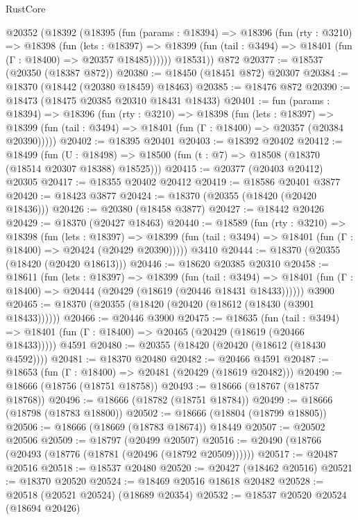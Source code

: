 \begin{lexlean}{RustCore}
\begin{coremodule}
    @20352
      (@18392
        (@18395
          (fun (params : @18394) =>
          @18396
            (fun (rty : @3210) =>
            @18398
              (fun (lets : @18397) =>
              @18399 (fun (tail : @3494) => @18401 (fun (Γ : @18400) => @20357 @18485))))))
        @18531))
    @872
@20377 := @18537 (@20350 (@18387 @872))
@20380 := @18450 (@18451 @872) @20307
@20384 := @18370 (@18442 (@20380 @18459) @18463)
@20385 := @18476 @872
@20390 := @18473 (@18475 @20385 @20310 @18431 @18433)
@20401 := fun (params : @18394) =>
  @18396
    (fun (rty : @3210) =>
    @18398
      (fun (lets : @18397) =>
      @18399 (fun (tail : @3494) => @18401 (fun (Γ : @18400) => @20357 (@20384 @20390)))))
@20402 := @18395 @20401
@20403 := @18392 @20402
@20412 := @18499
    (fun (U : @18498) => @18500 (fun (t : @7) => @18508 (@18370 (@18514 @20307 @18388) @18525)))
@20415 := @20377 (@20403 @20412) @20305
@20417 := @18355 @20402 @20412
@20419 := @18586 @20401 @3877
@20420 := @18423 @3877
@20424 := @18370 (@20355 (@18420 (@20420 @18436)))
@20426 := @20380 (@18458 @3877)
@20427 := @18442 @20426
@20429 := @18370 (@20427 @18463)
@20440 := @18589
    (fun (rty : @3210) =>
    @18398
      (fun (lets : @18397) =>
      @18399 (fun (tail : @3494) => @18401 (fun (Γ : @18400) => @20424 (@20429 @20390)))))
    @3410
@20444 := @18370 (@20355 (@18420 (@20420 @18613)))
@20446 := @18620 @20385 @20310
@20458 := @18611
    (fun (lets : @18397) =>
    @18399
      (fun (tail : @3494) =>
      @18401 (fun (Γ : @18400) => @20444 (@20429 (@18619 (@20446 @18431 @18433))))))
    @3900
@20465 := @18370 (@20355 (@18420 (@20420 (@18612 (@18430 (@3901 @18433))))))
@20466 := @20446 @3900
@20475 := @18635
    (fun (tail : @3494) => @18401 (fun (Γ : @18400) => @20465 (@20429 (@18619 (@20466 @18433)))))
    @4591
@20480 := @20355 (@18420 (@20420 (@18612 (@18430 @4592))))
@20481 := @18370 @20480
@20482 := @20466 @4591
@20487 := @18653 (fun (Γ : @18400) => @20481 (@20429 (@18619 @20482)))
@20490 := @18666 (@18756 (@18751 @18758))
@20493 := @18666 (@18767 (@18757 @18768))
@20496 := @18666 (@18782 (@18751 @18784))
@20499 := @18666 (@18798 (@18783 @18800))
@20502 := @18666 (@18804 (@18799 @18805))
@20506 := @18666 (@18669 (@18783 @18674)) @18449
@20507 := @20502 @20506
@20509 := @18797 (@20499 @20507)
@20516 := @20490 (@18766 (@20493 (@18776 (@18781 (@20496 (@18792 @20509))))))
@20517 := @20487 @20516
@20518 := @18537 @20480
@20520 := @20427 (@18462 @20516)
@20521 := @18370 @20520
@20524 := @18469 @20516 @18618 @20482
@20528 := @20518 (@20521 @20524) (@18689 @20354)
@20532 := @18537 @20520 @20524 (@18694 @20426)

\end{coremodule}
\end{lexlean}
